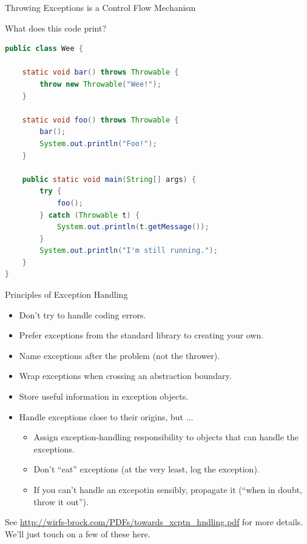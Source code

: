 \documentclass{beamer}
\begin{document}
\begin{frame}[fragile]{Throwing Exceptions is a Control Flow Mechanism}


What does this code print?
\begin{lstlisting}[language=Java]
public class Wee {

    static void bar() throws Throwable {
        throw new Throwable("Wee!");
    }

    static void foo() throws Throwable {
        bar();
        System.out.println("Foo!");
    }

    public static void main(String[] args) {
        try {        
            foo();
        } catch (Throwable t) {
            System.out.println(t.getMessage());
        }
        System.out.println("I'm still running.");
    }
}
\end{lstlisting}

\end{frame}

\begin{frame}[fragile]{Principles of Exception Handling}


\begin{itemize}
\item Don't try to handle coding errors.
\item Prefer exceptions from the standard library to creating your own.
\item Name exceptions after the problem (not the thrower).
\item Wrap exceptions when crossing an abstraction boundary.
\item Store useful information in exception objects.
\item Handle exceptions close to their origins, but ...
\begin{itemize}
  \item Assign exception-handling responsibility to objects that can handle the exceptions.
  \item Don't ``eat'' exceptions (at the very least, log the exception).
  \item If you can't handle an excepotin sensibly, propagate it (``when in doubt, throw it out'').
\end{itemize}
\end{itemize}

See \url{http://wirfs-brock.com/PDFs/towards_xcptn_hndling.pdf} for more details.  We'll just touch on a few of these here.

\end{frame}
\end{document}
